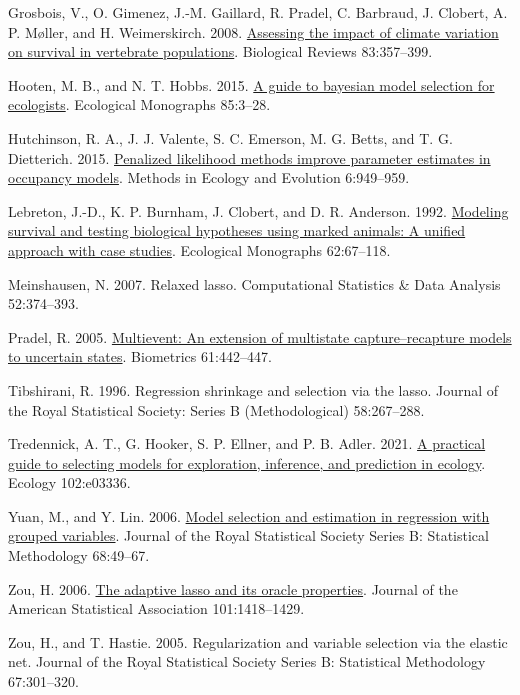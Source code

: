 \documentclass[
  11pt,
  a4paper,
]{article}
\newlength{\cslhangindent}
\newenvironment{CSLReferences}[2] %
 {\begin{list}{}{%
  \setlength{\itemindent}{0pt}
  \setlength{\leftmargin}{0pt}
  \setlength{\parsep}{0pt}
  \ifodd #1
   \setlength{\leftmargin}{\cslhangindent}
   \setlength{\itemindent}{-1\cslhangindent}
  \fi
  \setlength{\itemsep}{#2\baselineskip}}}
 {\end{list}}
\begin{document}
\begin{CSLReferences}{1}{0}
Grosbois, V., O. Gimenez, J.-M. Gaillard, R. Pradel, C. Barbraud, J. Clobert, A. P. Møller, and H. Weimerskirch. 2008. \href{https://doi.org/10.1111/j.1469-185X.2008.00047.x}{Assessing the impact of climate variation on survival in vertebrate populations}. Biological Reviews 83:357--399.

Hooten, M. B., and N. T. Hobbs. 2015. \href{https://doi.org/10.1890/14-0661.1}{A guide to bayesian model selection for ecologists}. Ecological Monographs 85:3--28.

Hutchinson, R. A., J. J. Valente, S. C. Emerson, M. G. Betts, and T. G. Dietterich. 2015. \href{https://doi.org/10.1111/2041-210X.12368}{Penalized likelihood methods improve parameter estimates in occupancy models}. Methods in Ecology and Evolution 6:949--959.

Lebreton, J.-D., K. P. Burnham, J. Clobert, and D. R. Anderson. 1992. \href{https://doi.org/10.2307/2937171}{Modeling survival and testing biological hypotheses using marked animals: A unified approach with case studies}. Ecological Monographs 62:67--118.

Meinshausen, N. 2007. Relaxed lasso. Computational Statistics \& Data Analysis 52:374--393.

Pradel, R. 2005. \href{https://doi.org/10.1111/j.1541-0420.2005.00318.x}{Multievent: An extension of multistate capture--recapture models to uncertain states}. Biometrics 61:442--447.

Tibshirani, R. 1996. Regression shrinkage and selection via the lasso. Journal of the Royal Statistical Society: Series B (Methodological) 58:267--288.

Tredennick, A. T., G. Hooker, S. P. Ellner, and P. B. Adler. 2021. \href{https://doi.org/10.1002/ecy.3336}{A practical guide to selecting models for exploration, inference, and prediction in ecology}. Ecology 102:e03336.

Yuan, M., and Y. Lin. 2006. \href{https://doi.org/10.1111/j.1467-9868.2005.00532.x}{Model selection and estimation in regression with grouped variables}. Journal of the Royal Statistical Society Series B: Statistical Methodology 68:49--67.

Zou, H. 2006. \href{http://www.jstor.org/stable/27639762}{The adaptive lasso and its oracle properties}. Journal of the American Statistical Association 101:1418--1429.

Zou, H., and T. Hastie. 2005. Regularization and variable selection via the elastic net. Journal of the Royal Statistical Society Series B: Statistical Methodology 67:301--320.

\end{CSLReferences}

\clearpage

\newpage
\end{document}
